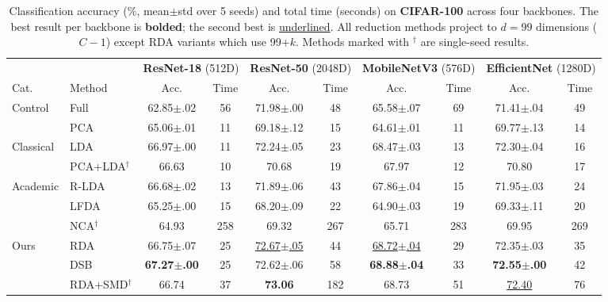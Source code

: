 \begin{table}[t]
\centering
\caption{Classification accuracy (\%, mean$\pm$std over 5 seeds) and total time (seconds) on \textbf{CIFAR-100} across four backbones. The best result per backbone is \textbf{bolded}; the second best is \underline{underlined}. All reduction methods project to $d = 99$ dimensions ($C - 1$) except RDA variants which use 99$+k$. Methods marked with $^\dagger$ are single-seed results.}
\label{tab:cifar100}
\small
\begin{tabular}{@{}l l cc cc cc cc@{}}
\toprule
& & \multicolumn{2}{c}{\textbf{ResNet-18} (512D)} & \multicolumn{2}{c}{\textbf{ResNet-50} (2048D)} & \multicolumn{2}{c}{\textbf{MobileNetV3} (576D)} & \multicolumn{2}{c}{\textbf{EfficientNet} (1280D)} \\
\cmidrule(lr){3-4} \cmidrule(lr){5-6} \cmidrule(lr){7-8} \cmidrule(lr){9-10}
Cat. & Method & Acc. & Time & Acc. & Time & Acc. & Time & Acc. & Time \\
\midrule
\multirow{2}{*}{Control}
& Full       & 62.85{\tiny$\pm$.02} & 56   & 71.98{\tiny$\pm$.00} & 48   & 65.58{\tiny$\pm$.07} & 69   & 71.41{\tiny$\pm$.04} & 49  \\
& PCA        & 65.06{\tiny$\pm$.01} & 11   & 69.18{\tiny$\pm$.12} & 15   & 64.61{\tiny$\pm$.01} & 11   & 69.77{\tiny$\pm$.13} & 14  \\
\midrule
\multirow{2}{*}{Classical}
& LDA        & 66.97{\tiny$\pm$.00} & 11   & 72.24{\tiny$\pm$.05} & 23   & 68.47{\tiny$\pm$.03} & 13   & 72.30{\tiny$\pm$.04} & 16  \\
& PCA+LDA$^\dagger$    & 66.63 & 10   & 70.68 & 19   & 67.97 & 12   & 70.80 & 17  \\
\midrule
\multirow{3}{*}{Academic}
& R-LDA      & 66.68{\tiny$\pm$.02} & 13   & 71.89{\tiny$\pm$.06} & 43   & 67.86{\tiny$\pm$.04} & 15   & 71.95{\tiny$\pm$.03} & 24  \\
& LFDA       & 65.25{\tiny$\pm$.00} & 15   & 68.20{\tiny$\pm$.09} & 22   & 64.90{\tiny$\pm$.03} & 19   & 69.33{\tiny$\pm$.11} & 20  \\
& NCA$^\dagger$        & 64.93 & 258  & 69.32 & 267  & 65.71 & 283  & 69.95 & 269 \\
\midrule
\multirow{3}{*}{Ours}
& RDA        & 66.75{\tiny$\pm$.07} & 25   & \underline{72.67{\tiny$\pm$.05}} & 44   & \underline{68.72{\tiny$\pm$.04}} & 29   & 72.35{\tiny$\pm$.03} & 35  \\
& DSB        & \textbf{67.27{\tiny$\pm$.00}} & 25   & 72.62{\tiny$\pm$.06} & 58   & \textbf{68.88{\tiny$\pm$.04}} & 33   & \textbf{72.55{\tiny$\pm$.00}} & 42  \\
& RDA+SMD$^\dagger$    & 66.74 & 37   & \textbf{73.06} & 182  & 68.73 & 51   & \underline{72.40} & 76  \\
\bottomrule
\end{tabular}
\end{table}

